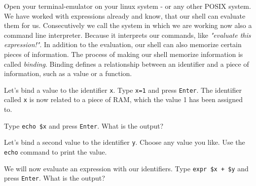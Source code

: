 \begin{challenge}
    \begin{task}
        Open your terminal-emulator on your linux system - or any other POSIX system.
        We have worked with expressions already and know, that our shell can evaluate them for us.
        Consecutively we call the system in which we are working now also a command line interpreter.
        Because it interprets our commands, like \textit{"evaluate this expression!"}.
        In addition to the evaluation, our shell can also memorize certain pieces of information.
        The process of making our shell memorize information is called \textit{binding}.
        Binding defines a relationship between an identifier and a piece of information, such as a value or a function.        
        \begin{questions}
            \item Let's bind a value to the identifier \texttt{x}. Type \texttt{x=1} and press \texttt{Enter}. The identifier called \texttt{x} is now related to a piece of RAM, which the value 1 has been assigned to.
            \item Type \texttt{echo \$x} and press \texttt{Enter}. What is the output?
            \item Let's bind a second value to the identifier \texttt{y}. Choose any value you like. Use the \texttt{echo} command to print the value.
            \item We will now evaluate an expression with our identifiers. Type \texttt{expr \$x + \$y} and press \texttt{Enter}. What is the output?
        \end{questions}
    \end{task}


\end{challenge}
